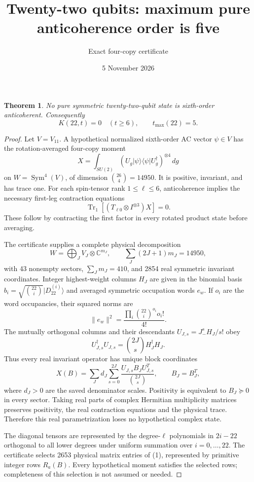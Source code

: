 \documentclass[11pt]{article}
\newtheorem{theorem}{Theorem}
\newcommand{\Tr}{\operatorname{Tr}}
\begin{document}
\title{Twenty-two qubits: maximum pure anticoherence order is five}
\author{Exact four-copy certificate}\date{5 November 2026}\maketitle
\begin{theorem}
No pure symmetric twenty-two-qubit state is sixth-order anticoherent.
Consequently
\[
\boxed{K(22,t)=0\quad(t\ge6),\qquad t_{\max}(22)=5.}
\]
\end{theorem}
\begin{proof}
Let $V=V_{11}$. A hypothetical normalized sixth-order AC vector $\psi\in V$ has the rotation-averaged four-copy moment
\[
X=\int_{SU(2)}(U_g|\psi\rangle\langle\psi|U_g^\dagger)^{\otimes4}\,dg
\]
on $W=\operatorname{Sym}^4(V)$, of dimension $\binom{26}{4}=14950$.
It is positive, invariant, and has trace one. For each spin-tensor rank $1\le\ell\le6$, anticoherence implies the necessary first-leg contraction equations
\[
\Tr_1[(T_{\ell0}\otimes I^{\otimes3})X]=0. \tag{1}
\]
These follow by contracting the first factor in every rotated product state before averaging.

The certificate supplies a complete physical decomposition
\[
W=\bigoplus_J V_J\otimes\mathbb C^{m_J},\qquad
\sum_J(2J+1)m_J=14950,
\]
with 43 nonempty sectors, $\sum_Jm_J=410$, and 2854 real symmetric invariant coordinates. Integer highest-weight columns $H_J$ are given in the binomial basis $b_i=\sqrt{\binom{22}{i}}|D_{22}^{(i)}\rangle$ and averaged symmetric occupation words $e_w$. If $o_i$ are the word occupancies, their squared norms are
\[
\|e_w\|^2=\frac{\prod_i\binom{22}{i}^{o_i}o_i!}{4!}.
\]
The mutually orthogonal columns and their descendants $U_{J,s}=J_-^sH_J/s!$ obey
\[
U_{J,s}^\dagger U_{J,s}=\binom{2J}{s}H_J^\dagger H_J.
\]
Thus every real invariant operator has unique block coordinates
\[
X(B)=\sum_Jd_J\sum_{s=0}^{2J}\frac{U_{J,s}B_JU_{J,s}^T}{\binom{2J}{s}},\qquad B_J=B_J^T,
\]
where $d_J>0$ are the saved denominator scales. Positivity is equivalent to $B_J\succeq0$ in every sector. Taking real parts of complex Hermitian multiplicity matrices preserves positivity, the real contraction equations and the physical trace. Therefore this real parametrization loses no hypothetical complex state.

The diagonal tensors are represented by the degree-$\ell$ polynomials in $2i-22$ orthogonal to all lower degrees under uniform summation over $i=0,\ldots,22$. The certificate selects 2653 physical matrix entries of (1), represented by primitive integer rows $R_a(B)$. Every hypothetical moment satisfies the selected rows; completeness of this selection is not assumed or needed.


\end{proof}
\end{document}
